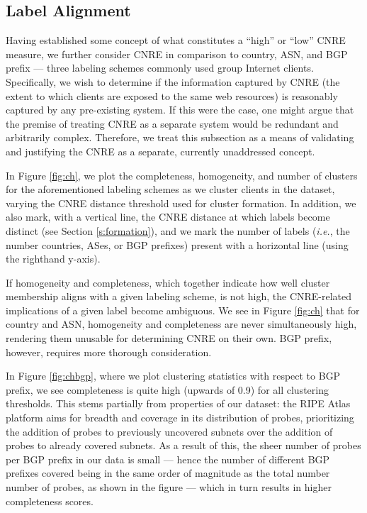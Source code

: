 \subsection{Label Alignment}
\label{s:labelalgn}

Having established some concept of what constitutes a ``high'' or
``low'' CNRE measure, we further consider CNRE in comparison to country, ASN,
and BGP prefix --- three labeling schemes commonly used group Internet clients.
Specifically, we wish to determine if the information captured by
CNRE (the extent to which clients are exposed to the same web resources) is
reasonably captured by any pre-existing system. If this were the case, one might
argue that the premise of treating CNRE as a separate system would be redundant
and arbitrarily complex. Therefore, we treat this subsection as a means of
validating and justifying the CNRE as a separate, currently unaddressed concept.

In Figure \ref{fig:ch}, we plot the completeness, homogeneity, and number of
clusters for the aforementioned labeling schemes as we cluster clients in the
dataset, varying the CNRE distance threshold used for cluster formation. In
addition, we also mark, with a vertical line, the CNRE distance at which labels
become distinct (see Section \ref{s:formation}), and we mark the number of labels
(\emph{i.e.}, the number countries, ASes, or BGP prefixes) present with a
horizontal line (using the righthand y-axis). 

If homogeneity and completeness, which together indicate how well cluster
membership aligns with a given labeling scheme, is not high, the CNRE-related
implications of a given label become ambiguous. We see in Figure \ref{fig:ch}
that for country and ASN, homogeneity and completeness are never simultaneously
high, rendering them unusable for determining CNRE on their own. BGP prefix,
however, requires more thorough consideration. 


In Figure \ref{fig:chbgp}, where we plot clustering statistics with respect to
BGP prefix, we see completeness is quite high (upwards of 0.9) for all
clustering thresholds. This stems partially from properties of our dataset: the
RIPE Atlas platform aims for breadth and coverage in its distribution of probes,
prioritizing the addition of probes to previously uncovered subnets over the
addition of probes to already covered subnets. As a result of this, the sheer
number of probes per BGP prefix in our data is small --- hence the number of
different BGP prefixes covered being in the same order of magnitude as the
total number number of probes, as shown in the figure --- which in turn results
in higher completeness scores. 

